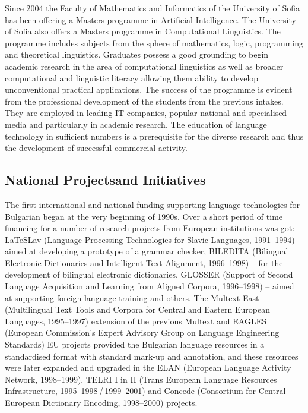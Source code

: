\documentclass[]{../../metanetpaper}
\begin{document}
\begin{multicols}{2}
Since 2004 the Faculty of Mathematics and Informatics of the University of Sofia has been offering a Masters programme in Artificial Intelligence. The University of Sofia also offers a Masters programme in Computational Linguistics. The programme includes subjects from the sphere of mathematics, logic, programming and theoretical linguistics. Graduates possess a good grounding to begin academic research in the area of computational linguistics as well as broader computational and linguistic literacy allowing them ability to develop unconventional practical applications. The success of the programme is evident from the professional development of the students from the previous intakes. They are employed in leading IT companies, popular national and specialised media and particularly in academic research.
The education of language technology in sufficient numbers is a prerequisite for the diverse research and thus the development of successful commercial activity.

\subsection[National Projects and Initiatives]{National Projects\newline and Initiatives}

The first international and national funding supporting language technologies for Bulgarian began at the very beginning of 1990s. Over a short period of time financing for a number of research projects from European institutions was got: LaTeSLav (Language Processing Technologies for Slavic Languages, 1991--1994) -- aimed at developing a prototype of a grammar checker, BILEDITA (Bilingual Electronic Dictionaries and Intelligent Text Alignment, 1996--1998) -- for the development of bilingual electronic dictionaries, GLOSSER (Support of Second Language Acquisition and Learning from Aligned Corpora, 1996--1998) -- aimed at supporting foreign language training and others. The Multext-East (Multilingual Text Tools and Corpora for Central and Eastern European Languages, 1995--1997) extension of the previous Multext and EAGLES (European Commission's Expert Advisory Group on Language Engineering Standards) EU projects provided the Bulgarian language resources in a standardised format
  with standard mark-up and annotation, and these resources were later expanded and upgraded in the ELAN (European Language Activity Network, 1998--1999), TELRI I in II (Trans European Language Resources Infrastructure, 1995--1998\,/\,1999--2001) and Concede (Consortium for Central European Dictionary Encoding, 1998--2000) projects.


\end{multicols}
\end{document}
